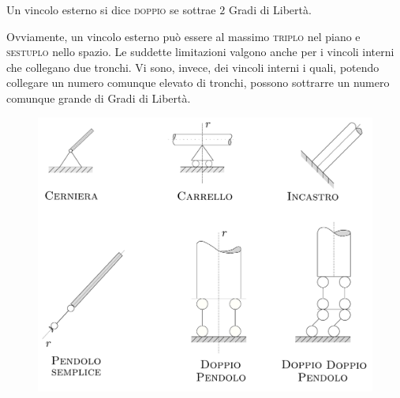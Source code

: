 \begin{definizione}
Un vincolo esterno si dice \textsc{doppio} se sottrae $2$ Gradi di Libertà. 
\end{definizione}
\noindent Ovviamente, un vincolo esterno può essere al massimo \textsc{triplo} nel piano e \textsc{sestuplo} nello spazio. Le suddette limitazioni valgono anche per i vincoli interni che collegano due tronchi. Vi sono, invece, dei vincoli interni i quali, potendo collegare un numero comunque elevato di tronchi, possono sottrarre un numero comunque grande di Gradi di Libertà. 
\renewcommand{\thefigure}{7~-~1}
\begin{figure}[ht]
\centering
\includegraphics[width=\textwidth]{Immagini/Parte_7/Figura7_1/Figura7_1.pdf}
\caption{}
\label{figura7-1}
\end{figure}

